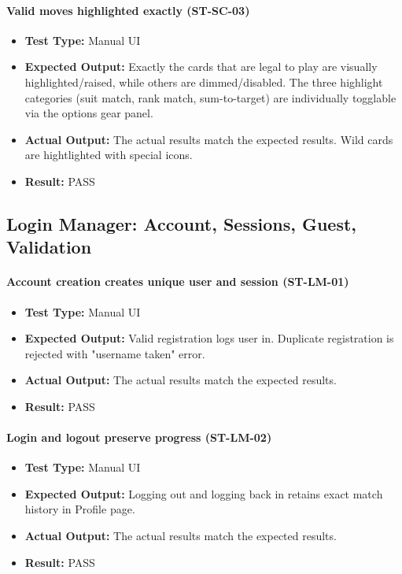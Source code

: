 \documentclass[12pt, titlepage]{article}
\begin{document}
\paragraph{Valid moves highlighted exactly (ST-SC-03)}
\begin{itemize}
  \item \textbf{Test Type:} Manual UI
  \item \textbf{Expected Output:} Exactly the cards that are legal to play are visually highlighted/raised, while others are dimmed/disabled. The three highlight categories (suit match, rank match, sum-to-target) are individually togglable via the options gear panel.
  \item \textbf{Actual Output:} The actual results match the expected results. Wild cards are hightlighted with special icons.
  \item \textbf{Result:} PASS
\end{itemize}


\subsection{Login Manager: Account, Sessions, Guest, Validation}

\paragraph{Account creation creates unique user and session (ST-LM-01)}
\begin{itemize}
  \item \textbf{Test Type:} Manual UI
  \item \textbf{Expected Output:} Valid registration logs user in. Duplicate registration is rejected with "username taken" error.
  \item \textbf{Actual Output:} The actual results match the expected results.
  \item \textbf{Result:} PASS
\end{itemize}

\paragraph{Login and logout preserve progress (ST-LM-02)}
\begin{itemize}
  \item \textbf{Test Type:} Manual UI
  \item \textbf{Expected Output:} Logging out and logging back in retains exact match history in Profile page.
  \item \textbf{Actual Output:} The actual results match the expected results.
  \item \textbf{Result:} PASS
\end{itemize}
\end{document}
